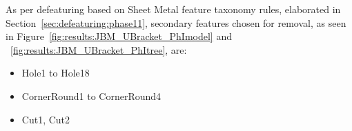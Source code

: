 
%
%
%

As per defeaturing based on Sheet Metal feature taxonomy rules, elaborated in Section~\ref{sec:defeaturing:phase11}, secondary features chosen for removal, as seen in Figure~\ref{fig:results:JBM_UBracket_PhImodel} and ~\ref{fig:results:JBM_UBracket_PhItree}, are:

\begin{itemize}[noitemsep,topsep=2pt,parsep=2pt,partopsep=2pt]
\item Hole1 to Hole18
\item CornerRound1 to CornerRound4
\item Cut1, Cut2
\end{itemize}



